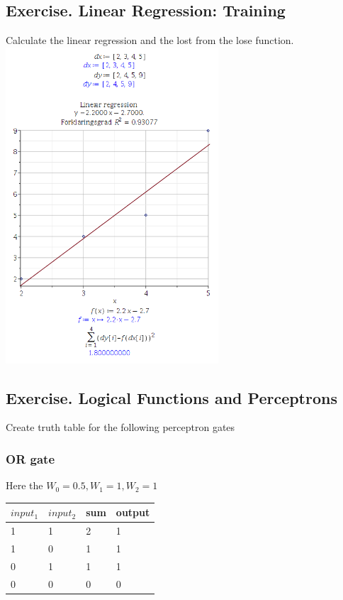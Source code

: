 \documentclass[12pt, a4paper]{article}
\begin{document}
		\subsection{Exercise. Linear Regression: Training}
			Calculate the linear regression and the lost from the lose function.\\
			\includegraphics[width=300px]{images/41,4.png}
		\subsection{Exercise. Logical Functions and Perceptrons}
			Create truth table for the following perceptron gates
			\subsubsection{OR gate}
				Here the $W_0=0.5, W_1=1, W_2=1$\\
				\begin{table}[h!]
				\begin{tabular}{|l|l|l|l|}
				\hline
				$input_1$ & $input_2$ & sum & output \\ \hline
				1     & 1     & 2   & 1      \\ \hline
				1     & 0     & 1   & 1      \\ \hline
				0     & 1     & 1   & 1      \\ \hline
				0     & 0     & 0   & 0      \\ \hline
				\end{tabular}
				\end{table}		
\end{document}

